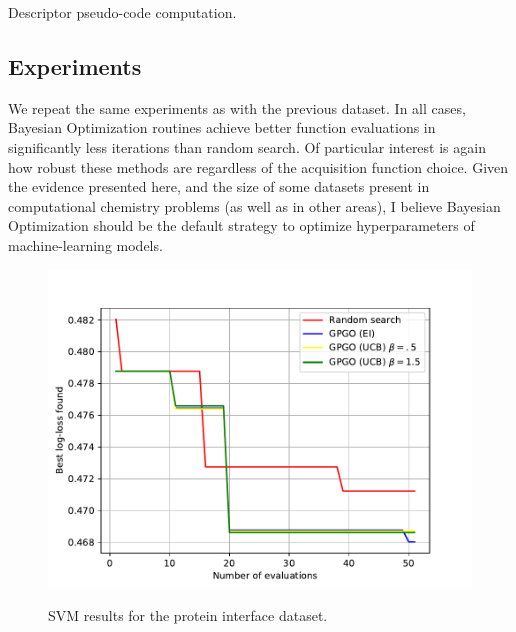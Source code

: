 \documentclass[10pt,a4paper,twoside]{book}
\begin{document}
 
  	\begin{algorithm}
		\caption{Descriptor pseudo-code computation.}
		\label{alg}
		\begin{algorithmic}[1]
							\EndFor
					\EndFor
			\EndFor
			\EndFunction
		\end{algorithmic}
	\end{algorithm}


\subsection{Experiments}

We repeat the same experiments as with the previous dataset. In all cases, Bayesian Optimization routines achieve better function evaluations in significantly less iterations than random search. Of particular interest is again how robust these methods are regardless of the acquisition function choice. Given the evidence presented here, and the size of some datasets present in computational chemistry problems (as well as in other areas), I believe Bayesian Optimization should be the default strategy to optimize hyperparameters of machine-learning models.

\begin{figure}
\centering
\caption{SVM results for the protein interface dataset.}
\includegraphics[scale=0.75]{figures/chapter4/pinter/svm}
\label{fig:affsvm}
\end{figure}
\end{document}
